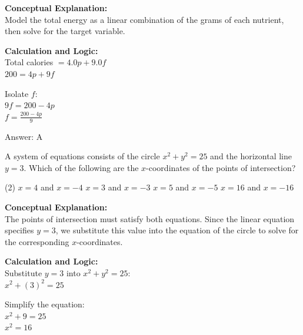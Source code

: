 \documentclass[11pt,paper=a4,answers]{exam}
\begin{document}
\begin{questions}
\begin{solution}
\textbf{Conceptual Explanation:} \\
Model the total energy as a linear combination of the grams of each nutrient, then solve for the target variable.

\vspace{20pt}

\textbf{Calculation and Logic:} \\
Total calories $= 4.0p + 9.0f$ \\
$200 = 4p + 9f$

\vspace{10pt}

Isolate $f$: \\
$9f = 200 - 4p$ \\
$f = \frac{200 - 4p}{9}$

\vspace{25pt}

Answer: \colorbox{yellow!100}{A}
\end{solution}

\question
A system of equations consists of the circle $x^2 + y^2 = 25$ and the horizontal line $y = 3$. Which of the following are the $x$-coordinates of the points of intersection?
\begin{tasks}(2)
    \task $x = 4$ and $x = -4$
    \task $x = 3$ and $x = -3$
    \task $x = 5$ and $x = -5$
    \task $x = 16$ and $x = -16$
\end{tasks}

\begin{solution}
\textbf{Conceptual Explanation:} \\
The points of intersection must satisfy both equations. Since the linear equation specifies $y = 3$, we substitute this value into the equation of the circle to solve for the corresponding $x$-coordinates.

\vspace{20pt}

\textbf{Calculation and Logic:} \\
Substitute $y = 3$ into $x^2 + y^2 = 25$: \\
$x^2 + (3)^2 = 25$

\vspace{10pt}

Simplify the equation: \\
$x^2 + 9 = 25$ \\
$x^2 = 16$


\end{solution}
\end{questions}
\end{document}
